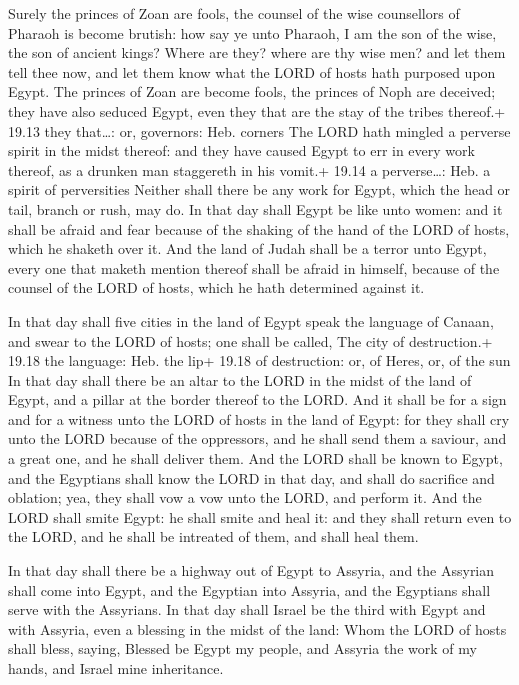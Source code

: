  Surely the princes of Zoan are fools, the counsel of the
wise counsellors of Pharaoh is become brutish: how say ye unto Pharaoh,
I am the son of the wise, the son of ancient kings?  Where
are they? where are thy wise men? and let them tell thee now, and let
them know what the LORD of hosts hath purposed upon Egypt. 
The princes of Zoan are become fools, the princes of Noph are deceived;
they have also seduced Egypt, even they that are the stay of the tribes
thereof.+ 19.13 they that\ldots: or, governors: Heb. corners
 The LORD hath mingled a perverse spirit in the midst
thereof: and they have caused Egypt to err in every work thereof, as a
drunken man staggereth in his vomit.+ 19.14 a perverse\ldots: Heb. a
spirit of perversities  Neither shall there be any work for
Egypt, which the head or tail, branch or rush, may do.  In
that day shall Egypt be like unto women: and it shall be afraid and fear
because of the shaking of the hand of the LORD of hosts, which he
shaketh over it.  And the land of Judah shall be a terror
unto Egypt, every one that maketh mention thereof shall be afraid in
himself, because of the counsel of the LORD of hosts, which he hath
determined against it.

 In that day shall five cities in the land of Egypt speak
the language of Canaan, and swear to the LORD of hosts; one shall be
called, The city of destruction.+ 19.18 the language: Heb. the lip+
19.18 of destruction: or, of Heres, or, of the sun  In that
day shall there be an altar to the LORD in the midst of the land of
Egypt, and a pillar at the border thereof to the LORD.  And
it shall be for a sign and for a witness unto the LORD of hosts in the
land of Egypt: for they shall cry unto the LORD because of the
oppressors, and he shall send them a saviour, and a great one, and he
shall deliver them.  And the LORD shall be known to Egypt,
and the Egyptians shall know the LORD in that day, and shall do
sacrifice and oblation; yea, they shall vow a vow unto the LORD, and
perform it.  And the LORD shall smite Egypt: he shall smite
and heal it: and they shall return even to the LORD, and he shall be
intreated of them, and shall heal them.

 In that day shall there be a highway out of Egypt to
Assyria, and the Assyrian shall come into Egypt, and the Egyptian into
Assyria, and the Egyptians shall serve with the Assyrians. 
In that day shall Israel be the third with Egypt and with Assyria, even
a blessing in the midst of the land:  Whom the LORD of
hosts shall bless, saying, Blessed be Egypt my people, and Assyria the
work of my hands, and Israel mine inheritance.

